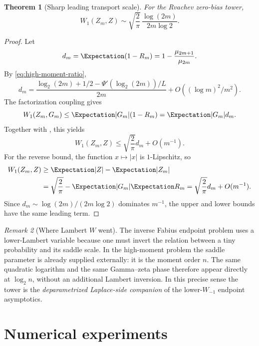 \documentclass[11pt,oneside]{article}
\newtheorem{theorem}{Theorem}[section]
\theoremstyle{definition}
\theoremstyle{remark}
\newtheorem{remark}[theorem]{Remark}
\begin{document}
\begin{theorem}[Sharp leading transport scale]
\label{thm:W1-rate}
For the Rvachev zero-bias tower,
\begin{equation}
 \boxed{
 W_1(Z_m,Z)
 \sim \sqrt{\frac2\pi}\,
       \frac{\log(2m)}{2m\log2}.}                   \label{eq:W1-rate}
\end{equation}
\end{theorem}

\begin{proof}
Let
\[
 d_m=\Expectation(1-R_m)=1-\frac{\mu_{2m+1}}{\mu_{2m}}.
\]
By \eqref{eq:high-moment-ratio},
\begin{equation}
 d_m
 =\frac{\log_2(2m)+1/2-\Psi'(\log_2(2m))/L}{2m}
  +O((\log m)^2/m^2).                               \label{eq:dm}
\end{equation}
The factorization coupling gives
\[
 W_1(Z_m,G_m)
 \le\Expectation|G_m|(1-R_m)=\Expectation|G_m|d_m.
\]
Together with , this yields
\begin{equation}
 W_1(Z_m,Z)
 \le\sqrt{\frac2\pi}d_m+O(m^{-1}).                 \label{eq:W1-upper}
\end{equation}
For the reverse bound, the function $x\mapsto|x|$ is $1$-Lipschitz, so
\begin{align*}
 W_1(Z_m,Z)
 &\ge \Expectation|Z|-\Expectation|Z_m|\\
 &=\sqrt{\frac2\pi}-\Expectation|G_m|\Expectation R_m
  =\sqrt{\frac2\pi}d_m+O(m^{-1}).                  \label{eq:W1-lower}
\end{align*}
Since $d_m\sim\log(2m)/(2m\log2)$ dominates $m^{-1}$, the upper and lower
bounds have the same leading term.
\end{proof}

\begin{remark}[Where Lambert $W$ went]
The inverse Fabius endpoint problem uses a lower-Lambert variable because one
must invert the relation between a tiny probability and its saddle scale.  In
the high-moment problem the saddle parameter is already supplied externally:
it is the moment order $n$.  The same quadratic logarithm and the same
Gamma--zeta phase therefore appear directly at $\log_2n$, without an additional
Lambert inversion.  In this precise sense the tower is the
\emph{deparametrized Laplace-side companion} of the lower-$W_{-1}$ endpoint
asymptotics.
\end{remark}

\section{Numerical experiments}
\label{sec:numerics}
\end{document}
